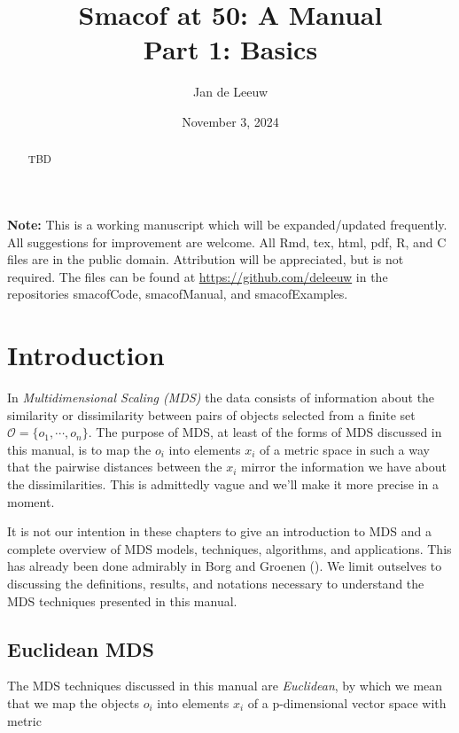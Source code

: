 \documentclass[
  12pt,
  letterpaper,
  DIV=11,
  numbers=noendperiod]{scrartcl}
\title{Smacof at 50: A Manual\\
Part 1: Basics}
\author{Jan de Leeuw}
\date{November 3, 2024}
\newcommand{\sectionbreak}{\pagebreak}
\renewcommand*\contentsname{Table of contents}
\newcommand\contentsname{Table of contents}
\begin{document}
\maketitle
\begin{abstract}
TBD
\end{abstract}

\renewcommand*\contentsname{Table of contents}
{
\hypersetup{linkcolor=}
\setcounter{tocdepth}{3}
\tableofcontents
}

\textbf{Note:} This is a working manuscript which will be
expanded/updated frequently. All suggestions for improvement are
welcome. All Rmd, tex, html, pdf, R, and C files are in the public
domain. Attribution will be appreciated, but is not required. The files
can be found at \url{https://github.com/deleeuw} in the repositories
smacofCode, smacofManual, and smacofExamples.

\sectionbreak

\section{Introduction}\label{introduction}

In \emph{Multidimensional Scaling (MDS)} the data consists of
information about the similarity or dissimilarity between pairs of
objects selected from a finite set \(\mathcal{O}=\{o_1,\cdots,o_n\}\).
The purpose of MDS, at least of the forms of MDS discussed in this
manual, is to map the \(o_i\) into elements \(x_i\) of a metric space in
such a way that the pairwise distances between the \(x_i\) mirror the
information we have about the dissimilarities. This is admittedly vague
and we'll make it more precise in a moment.

It is not our intention in these chapters to give an introduction to MDS
and a complete overview of MDS models, techniques, algorithms, and
applications. This has already been done admirably in Borg and Groenen
(). We limit outselves to discussing
the definitions, results, and notations necessary to understand the MDS
techniques presented in this manual.

\subsection{Euclidean MDS}\label{euclidean-mds}

The MDS techniques discussed in this manual are \emph{Euclidean}, by
which we mean that we map the objects \(o_i\) into elements \(x_i\) of a
p-dimensional vector space with metric
\end{document}
